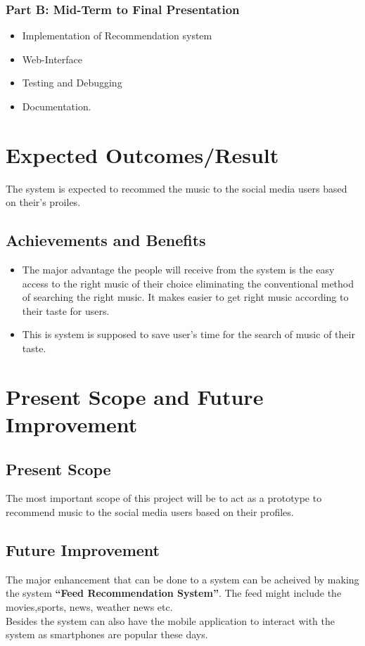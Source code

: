 \documentclass{article}
\begin{document}
\subsubsection{Part B: Mid-Term to Final Presentation}
\begin{itemize}
\item Implementation of Recommendation system
\item Web-Interface
\item Testing and Debugging 
\item Documentation.
\end{itemize}

\section{Expected Outcomes/Result}
The system is expected to recommed the music to the social media users based on their's proiles.
\subsection{Achievements and Benefits}
\begin{itemize}
\item The major advantage the people will receive from the system is the easy access to the right music of their choice eliminating the conventional method of searching the right music. It makes easier to get right music according to their taste for users.
\item This is system is supposed to save user's time for the search of music of their taste.
\end{itemize}
\cleardoublepage

\section{Present Scope and Future Improvement}
\subsection{Present Scope}
The most important scope of this project will be to act as a prototype to recommend music to the social media users based on their profiles.
\subsection{Future Improvement}
The major enhancement that can be done to a system can be acheived by making the system \textbf{``Feed Recommendation System''}. The feed might include the movies,sports, news, weather news etc.\\
Besides the system can also have the mobile application to interact with the system as smartphones are popular these days.
\cleardoublepage
\end{document}
